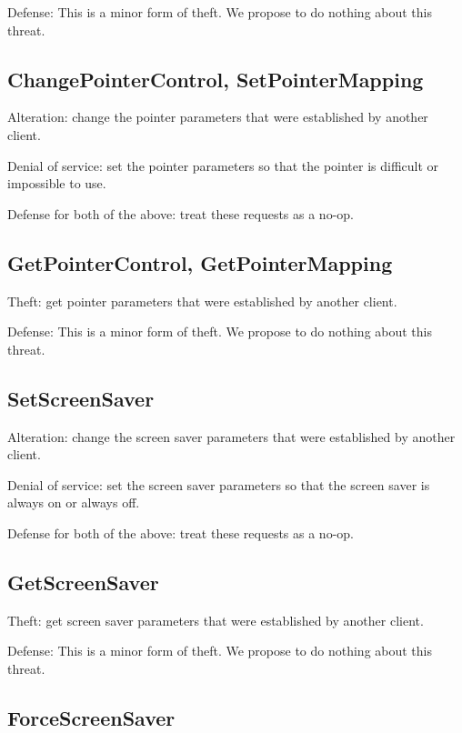 Defense: This is a minor form of theft.  We propose to do nothing
about this threat.



\subsection{ChangePointerControl, SetPointerMapping}

Alteration: change the pointer parameters that were established by
another client.

Denial of service: set the pointer parameters so that the pointer is
difficult or impossible to use.

Defense for both of the above: treat these requests as a no-op.



\subsection{GetPointerControl, GetPointerMapping}

Theft: get pointer parameters that were established by another client.

Defense: This is a minor form of theft.  We propose to do nothing
about this threat.



\subsection{SetScreenSaver}

Alteration: change the screen saver parameters that were established
by another client.

Denial of service: set the screen saver parameters so that the screen
saver is always on or always off.

Defense for both of the above: treat these requests as a no-op.



\subsection{GetScreenSaver}

Theft: get screen saver parameters that were established by another
client.

Defense: This is a minor form of theft.  We propose to do nothing
about this threat.



\subsection{ForceScreenSaver}

